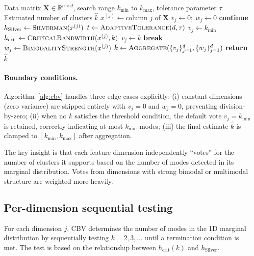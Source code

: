 \documentclass[journal]{IEEEtran}
\begin{document}
\begin{algorithm}[t]
\caption{CBV Index}
\label{alg:cbv}
\begin{algorithmic}[1]
\Require Data matrix $\mathbf{X} \in \mathbb{R}^{n \times d}$, search range $k_{\min}$ to $k_{\max}$, tolerance parameter $\tau$
\Ensure Estimated number of clusters $\hat{k}$
    \State $x^{(j)} \gets \text{column } j \text{ of } \mathbf{X}$
        \State $v_j \gets 0;\ w_j \gets 0$\;
        \State \textbf{continue}
    \EndIf
    \State $h_{\mathrm{Silver}} \gets \textsc{Silverman}(x^{(j)})$
    \State $t \gets \textsc{AdaptiveTolerance}(d, \tau)$
    \State $v_j \gets k_{\min}$
        \State $h_{\mathrm{crit}} \gets \textsc{CriticalBandwidth}(x^{(j)}, k)$
            \State $v_j \gets k$
            \State \textbf{break}
        \EndIf
    \EndFor
    \State $w_j \gets \textsc{BimodalityStrength}(x^{(j)})$
\EndFor
\State $\hat{k} \gets \textsc{Aggregate}(\{v_j\}_{j=1}^{d}, \{w_j\}_{j=1}^{d})$
\State \textbf{return} $\hat{k}$
\end{algorithmic}
\end{algorithm}

\paragraph{Boundary conditions.}
Algorithm~\ref{alg:cbv} handles three edge cases explicitly: (i) constant dimensions (zero variance) are skipped entirely with $v_j = 0$ and $w_j = 0$, preventing division-by-zero; (ii) when no $k$ satisfies the threshold condition, the default vote $v_j = k_{\min}$ is retained, correctly indicating at most $k_{\min}$ modes; (iii) the final estimate $\hat{k}$ is clamped to $[k_{\min}, k_{\max}]$ after aggregation.

The key insight is that each feature dimension independently ``votes'' for the number of clusters it supports based on the number of modes detected in its marginal distribution. Votes from dimensions with strong bimodal or multimodal structure are weighted more heavily.

\subsection{Per-dimension sequential testing}
\label{sec:sequential-testing}

For each dimension $j$, CBV determines the number of modes in the 1D marginal distribution by sequentially testing $k = 2, 3, \ldots$ until a termination condition is met. The test is based on the relationship between $h_{\mathrm{crit}}(k)$ and $h_{\mathrm{Silver}}$.
\end{document}
